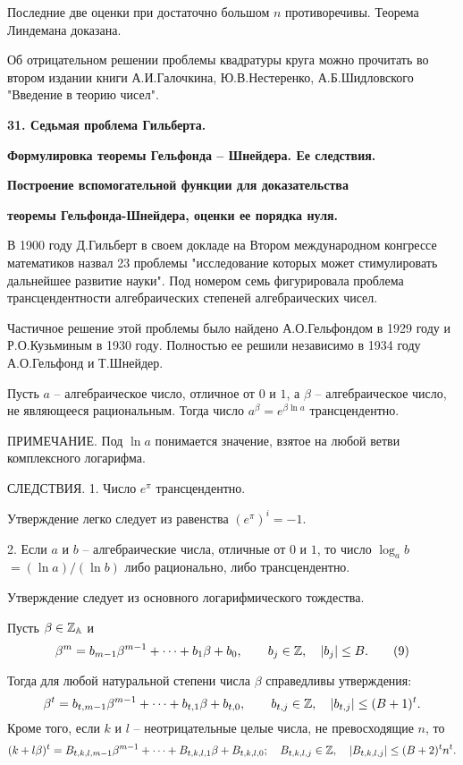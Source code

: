 Последние две оценки при достаточно большом $n$ противоречивы. Теорема
Линдемана  доказана.
\enddemo

Об отрицательном решении проблемы квадратуры круга можно прочитать во
втором издании книги А.И.Галочкина, Ю.В.Нестеренко, А.Б.Шидловского
"Введение в теорию чисел".

\vskip 5mm
\centerline{\bf {31. Седьмая проблема Гильберта.}}
\centerline{\bf {Формулировка теоремы Гельфонда -- Шнейдера. Ее следствия.}}
\centerline{\bf { Построение вспомогательной функции для доказательства}}
\centerline{\bf {теоремы Гельфонда-Шнейдера, оценки ее порядка нуля.}}
\vskip 5mm

В 1900 году Д.Гильберт в своем докладе на Втором международном конгрессе
математиков назвал 23 проблемы "исследование которых может стимулировать
дальнейшее развитие науки". Под номером семь фигурировала проблема
трансцендентности алгебраических степеней алгебраических чисел.

Частичное решение этой проблемы было найдено А.О.Гельфондом в 1929 году и
Р.О.Кузьминым в 1930 году. Полностью ее решили независимо в 1934 году
А.О.Гельфонд и Т.Шнейдер.

 Пусть $a$  -- алгебраическое число,
отличное от $0$  и $1$, а $\beta$   -- алгебраическое число,
не являющееся рациональным.  Тогда число $a^{\beta}=e^{\beta\ln a}$
трансцендентно.
\endproclaim

ПРИМЕЧАНИЕ. Под $\ln a$ понимается значение, взятое на любой ветви комплексного
логарифма.

СЛЕДСТВИЯ. 1. Число $e^{\pi}$ трансцендентно.

Утверждение легко следует из равенства $(e^{\pi})^i=-1$.

2. Если $a$  и $b$  -- алгебраические числа,
отличные  от $0$  и $1$,  то число $\log_ab$ $=(\ln a)/(\ln b)$
либо рационально, либо трансцендентно.

Утверждение следует из основного логарифмического тождества.

 Пусть $\beta\in\Bbb Z_{\Bbb A}$ и
$$
\beta^m=b_{m-1}\beta^{m-1}+ \dots +b_1\beta + b_0, \qquad b_j\in \Bbb Z, \quad
|b_j| \le B.
\tag 9
$$

Тогда для любой натуральной степени   числа  $\beta$ справедливы утверждения:
$$
\beta^t=b_{t,m-1}\beta^{m-1}+\dots + b_{t,1}\beta +b_{t,0}, \qquad
b_{t,j}\in\Bbb Z, \quad |b_{t,j}| \le (B+1)^t.
$$
Кроме того, если $k$  и $l$   -- неотрицательные целые
числа, не превосходящие $n$,  то
$$
(k+l\beta)^t=B_{t,k,l,m-1}\beta^{m-1}+\dots +B_{t,k,l,1}\beta +B_{t,k,l,0};
\quad B_{t,k,l,j}\in \Bbb Z, \quad |B_{t,k,l,j}|\le (B+2)^tn^t.
$$
\endproclaim

